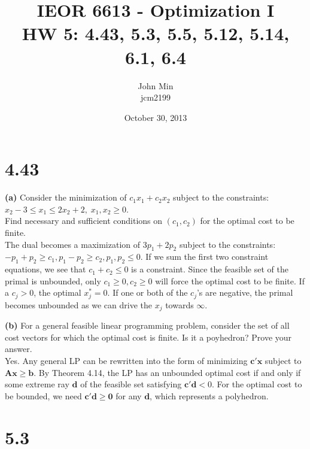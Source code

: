 \documentclass{article}
\begin{document}
\title{IEOR 6613 - Optimization I\\ HW 5:  4.43, 5.3, 5.5, 5.12, 5.14, 6.1, 6.4}

\author{John Min\\ jcm2199}
\date{October 30, 2013}
\maketitle

\section*{4.43}

\textbf{(a)}  Consider the minimization of $c_1 x_1 + c_2 x_2$ subject to the constraints:
$x_2 - 3 \leq x_1 \leq 2 x_2 +2, \; x_1, x_2 \geq 0$. \\
\noindent 
Find necessary and sufficient conditions on $(c_1, c_2)$ for the optimal cost to be finite.\\

\noindent
The dual becomes a maximization of $3 p_1 + 2 p_2$ subject to the constraints: $- p_1 + p_2 \geq c_1, p_1 - p_2 \geq c_2, p_1, p_2 \leq 0$.  If we sum the first two constraint equations, we see that $c_1 + c_2 \leq 0$ is a constraint.  Since the feasible set of the primal is unbounded, only $c_1 \geq 0, c_2 \geq 0$ will force the optimal cost to be finite.  If a $c_j > 0$, the optimal $x^*_j = 0$.  If one or both of the $c_j$'s are negative, the primal becomes unbounded as we can drive the $x_j$ towards $\infty$. \\
\noindent


\noindent
\textbf{(b)}
For a general feasible linear programming problem, consider the set of all cost vectors for which the optimal cost is finite.  Is it a poyhedron?  Prove your answer. \\

\noindent
Yes.  Any general LP can be rewritten into the form of minimizing $\mathbf{c'x}$ subject to $\mathbf{Ax \geq b}$.  By Theorem 4.14, the LP has an unbounded optimal cost if and only if some extreme ray $\mathbf{d}$ of the feasible set satisfying $\mathbf{c'd} < 0$.  For the optimal cost to be bounded, we need $\mathbf{c'd \geq 0}$ for any $\mathbf{d}$, which represents a polyhedron. \\


\section*{5.3}
\end{document}
